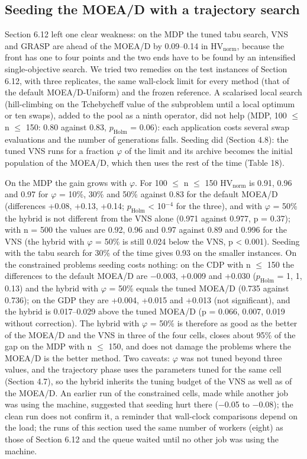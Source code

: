 \subsection{Seeding the MOEA/D with a trajectory search}\label{sec:seeding_the_moea_d_with_a_tr}

Section 6.12 left one clear weakness: on the MDP the tuned tabu search, VNS and GRASP are ahead of the MOEA/D by 0.09--0.14 in $\mathrm{HV}_{\mathrm{norm}}$, because the front has one to four points and the two ends have to be found by an intensified single-objective search. We tried two remedies on the test instances of Section 6.12, with three replicates, the same wall-clock limit for every method (that of the default MOEA/D-Uniform) and the frozen reference. A scalarised local search (hill-climbing on the Tchebycheff value of the subproblem until a local optimum or ten swaps), added to the pool as a ninth operator, did not help (MDP, 100 $\leq$ n $\leq$ 150: 0.80 against 0.83, $p_{\mathrm{Holm}}$ = 0.06): each application costs several swap evaluations and the number of generations falls. Seeding did (Section 4.8): the tuned VNS runs for a fraction $\varphi$ of the limit and its archive becomes the initial population of the MOEA/D, which then uses the rest of the time (Table 18).

On the MDP the gain grows with $\varphi$. For 100 $\leq$ n $\leq$ 150 $\mathrm{HV}_{\mathrm{norm}}$ is 0.91, 0.96 and 0.97 for $\varphi$ = 10\%, 30\% and 50\% against 0.83 for the default MOEA/D (differences +0.08, +0.13, +0.14; $p_{\mathrm{Holm}}$ < 10$^{-4}$ for the three), and with $\varphi$ = 50\% the hybrid is not different from the VNS alone (0.971 against 0.977, p = 0.37); with n = 500 the values are 0.92, 0.96 and 0.97 against 0.89 and 0.996 for the VNS (the hybrid with $\varphi$ = 50\% is still 0.024 below the VNS, p < 0.001). Seeding with the tabu search for 30\% of the time gives 0.93 on the smaller instances. On the constrained problems seeding costs nothing: on the CDP with n $\leq$ 150 the differences to the default MOEA/D are $-$0.003, +0.009 and +0.030 ($p_{\mathrm{Holm}}$ = 1, 1, 0.13) and the hybrid with $\varphi$ = 50\% equals the tuned MOEA/D (0.735 against 0.736); on the GDP they are +0.004, +0.015 and +0.013 (not significant), and the hybrid is 0.017--0.029 above the tuned MOEA/D (p = 0.066, 0.007, 0.019 without correction).  The hybrid with $\varphi$ = 50\% is therefore as good as the better of the MOEA/D and the VNS in three of the four cells, closes about 95\% of the gap on the MDP with n $\leq$ 150, and does not damage the problems where the MOEA/D is the better method. Two caveats: $\varphi$ was not tuned beyond three values, and the trajectory phase uses the parameters tuned for the same cell (Section 4.7), so the hybrid inherits the tuning budget of the VNS as well as of the MOEA/D. An earlier run of the constrained cells, made while another job was using the machine, suggested that seeding hurt there ($-$0.05 to $-$0.08); the clean run does not confirm it, a reminder that wall-clock comparisons depend on the load; the runs of this section used the same number of workers (eight) as those of Section 6.12 and the queue waited until no other job was using the machine.

